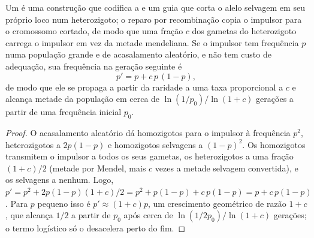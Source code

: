 \begin{theorem}\label{thm:b3:genetic-engineering:drive}
Um \emph{} é uma construção que codifica a  e um
guia que corta o alelo selvagem em seu próprio loco num heterozigoto; o
reparo por recombinação copia o impulsor para o cromossomo cortado, de
modo que uma fração $c$ dos gametas do heterozigoto carrega o impulsor
em vez da metade mendeliana. Se o impulsor tem frequência $p$ numa
população grande e de acasalamento aleatório, e não tem custo de
adequação, sua frequência na geração seguinte é
\[
p' = p + c\,p\,(1 - p),
\]
de modo que ele se propaga a partir da raridade a uma taxa proporcional
a $c$ e alcança metade da população em cerca de
$\ln(1/p_{0})/\ln(1 + c)$ gerações a partir de uma frequência inicial
$p_{0}$.
\end{theorem}
\begin{proof}
O acasalamento aleatório dá homozigotos para o impulsor à frequência
$p^{2}$, heterozigotos a $2p(1-p)$ e homozigotos selvagens a
$(1-p)^{2}$. Os homozigotos transmitem o impulsor a todos os seus
gametas, os heterozigotos a uma fração $(1 + c)/2$ (metade por Mendel,
mais $c$ vezes a metade selvagem convertida), e os selvagens a nenhum.
Logo, $p' = p^{2} + 2p(1-p)(1+c)/2
= p^{2} + p(1-p) + c\,p(1-p) = p + c\,p(1-p)$. Para $p$ pequeno isso é $p' \approx (1+c)p$, um crescimento
geométrico de razão $1 + c$, que alcança $1/2$ a partir de $p_{0}$ após
cerca de $\ln(1/2p_{0})/\ln(1+c)$ gerações; o termo logístico só o
desacelera perto do fim.
\end{proof}

